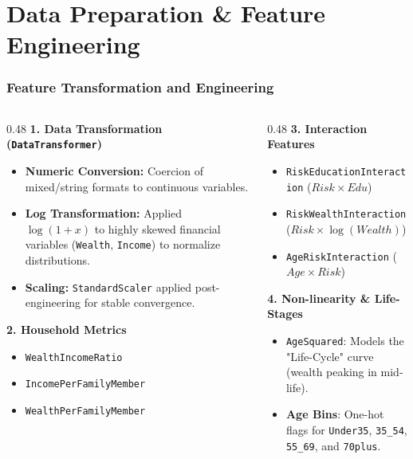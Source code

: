 \documentclass[aspectratio=169]{beamer}
\begin{document}
\section{Data Preparation \& Feature Engineering}

\begin{frame}
	\frametitle{Feature Transformation and Engineering}
	\begin{columns}[T]
		\begin{column}{0.48\textwidth}
			\textbf{1. Data Transformation (\texttt{DataTransformer})}
			\begin{itemize}
				\item \textbf{Numeric Conversion:} Coercion of mixed/string formats to continuous variables.
				\item \textbf{Log Transformation:} Applied $\log(1+x)$ to highly skewed financial variables (\texttt{Wealth}, \texttt{Income}) to normalize distributions.
				\item \textbf{Scaling:} \texttt{StandardScaler} applied post-engineering for stable convergence.
			\end{itemize}
			\vspace{0.3cm}
			\textbf{2. Household Metrics}
			\begin{itemize}
				\item \texttt{WealthIncomeRatio}
				\item \texttt{IncomePerFamilyMember}
				\item \texttt{WealthPerFamilyMember}
			\end{itemize}
		\end{column}
		\begin{column}{0.48\textwidth}
			\textbf{3. Interaction Features}
			\begin{itemize}
				\item \texttt{RiskEducationInteraction} ($Risk \times Edu$)
				\item \texttt{RiskWealthInteraction} ($Risk \times \log(Wealth)$)
				\item \texttt{AgeRiskInteraction} ($Age \times Risk$)
			\end{itemize}
			\vspace{0.3cm}
			\textbf{4. Non-linearity \& Life-Stages}
			\begin{itemize}
				\item \texttt{AgeSquared}: Models the "Life-Cycle" curve (wealth peaking in mid-life).
				\item \textbf{Age Bins}: One-hot flags for \texttt{Under35}, \texttt{35\_54}, \texttt{55\_69}, and \texttt{70plus}.
			\end{itemize}
		\end{column}
	\end{columns}
\end{frame}
\end{document}
